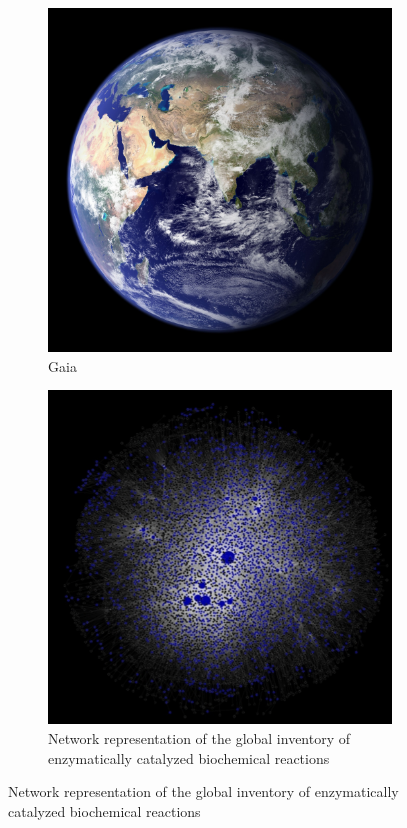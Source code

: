 \documentclass[]{article}
\begin{document}
\begin{figure}[H]
	\caption{Is there Life on the scale of a Planet?}\label{fig:gaia}
	\begin{subfigure}[b]{0.45\textwidth}
		\caption{Gaia}
		\includegraphics[width=\textwidth]{Globe1}
	\end{subfigure}
	\begin{subfigure}[b]{0.45\textwidth}
		\caption{Network representation of the global inventory of
			enzymatically catalyzed biochemical reactions}
		\includegraphics[width=\textwidth]{Globe2}
	\end{subfigure}
\end{figure}
\end{document}
